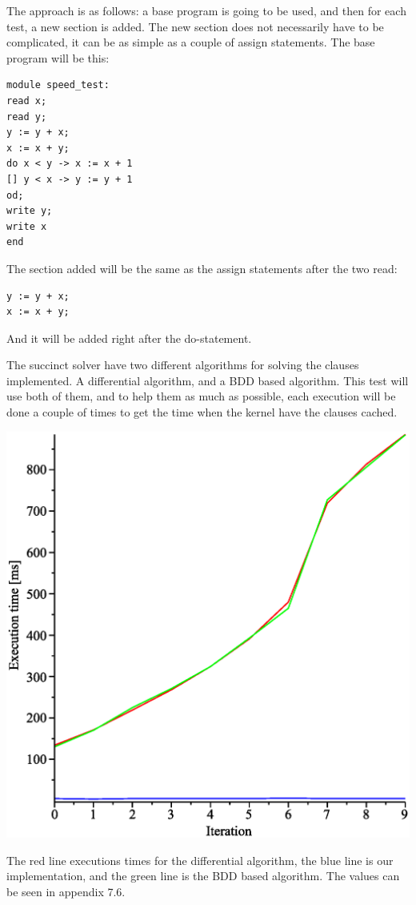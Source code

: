 The approach is as follows: a base program is going to be used, and then for each test, a new section is added. The new section does not necessarily have to be complicated, it can be as simple as a couple of assign statements. The base program will be this:
\begin{lstlisting}
module speed_test:
read x;
read y;
y := y + x;
x := x + y;
do x < y -> x := x + 1
[] y < x -> y := y + 1
od;
write y;
write x
end
\end{lstlisting}
The section added will be the same as the assign statements after the two read:
\begin{lstlisting}
y := y + x;
x := x + y;
\end{lstlisting}
And it will be added right after the do-statement.

The succinct solver have two different algorithms for solving the clauses implemented. A differential algorithm, and a BDD based algorithm. This test will use both of them, and to help them as much as possible, each execution will be done a couple of times to get the time when the kernel have the clauses cached.

\includegraphics[width=1\textwidth]{alfp_graph.eps}

The red line executions times for the differential algorithm, the blue line is our implementation, and the green line is the BDD based algorithm. The values can be seen in appendix 7.6.

